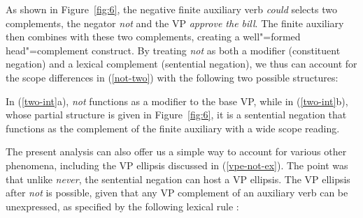 \documentclass[output=paper
                ,modfonts
                		,nonflat
	        ,collection
	        ,collectionchapter
	        ,collectiontoclongg
 	        ,biblatex
                ,babelshorthands
                ,newtxmath
                ,draftmode
                ,colorlinks, citecolor=brown
]{./langsci/langscibook}
\begin{document}
{\begin{exe}
\begin{xlist}
\begin{exe}
\begin{xlist}
As shown in Figure~\ref{fig:6}, the negative finite auxiliary verb \textit{could} selects two complements, the negator
\textit{not} and the VP \textit{approve the bill}. The finite auxiliary then
combines with these two complements, creating a well"=formed head"=complement construct.
By treating \textit{not} as both a modifier (constituent negation)
and a lexical complement (sentential negation), we thus can
account for the scope differences in (\ref{not-two}) with the
following two possible structures:

\eal
\label{two-int}
\zl
%
In (\ref{two-int}a), \textit{not} functions as a modifier to
the base VP, while  in (\ref{two-int}b), whose partial structure is
given in Figure~\ref{fig:6}, it is a sentential
negation that functions as the complement of the finite auxiliary
with a wide scope reading.

The present analysis can also offer us
a simple way to account for various other phenomena,
including the VP ellipsis discussed in (\ref{vpe-not-ex}). The point
was that unlike \textit{never}, the sentential negation can
host a VP ellipsis.  The VP ellipsis after \textit{not} is
possible, given that any VP complement of an auxiliary
verb can be unexpressed, as
specified by the following lexical rule \citep{kim:00}:



\end{xlist}
\end{exe}
\end{xlist}
\end{exe}}
\end{document}
